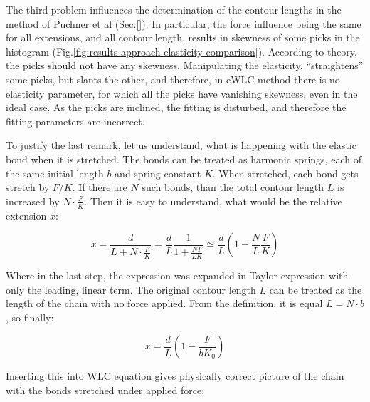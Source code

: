 The third problem influences the determination of the contour lengths in the method of Puchner et al (Sec.\ref{}).
In particular, the force influence being the same for all extensions, and all contour length, results in skewness of some picks in the histogram (Fig.\ref{fig:results-approach-elasticity-comparison}).
According to theory, the picks should not have any skewness.
Manipulating the elasticity, ``straightens'' some picks, but slants the other, and therefore, in eWLC method there is no elasticity parameter, for which all the picks have vanishing skewness, even in the ideal case.
As the picks are inclined, the fitting is disturbed, and therefore the fitting parameters are incorrect.

\setcounter{fignums}{\value{figure}}

To justify the last remark, let us understand, what is happening with the elastic bond when it is stretched.
The bonds can be treated as harmonic springs, each of the same initial length $b$ and spring constant $K$.
When stretched, each bond gets stretch by $F/K$.
If there are $N$ such bonds, than the total contour length $L$ is increased by $N\cdot\frac{F}{K}$.
Then it is easy to understand, what would be the relative extension $x$:

\begin{equation}
    x = \frac{d}{L + N\cdot\frac{F}{K}}=\frac{d}{L}\frac{1}{1+\frac{NF}{LK}}\simeq\frac{d}{L}(1-\frac{N}{L}\frac{F}{K})
    \label{eq:results-approach-elasticity-x}
\end{equation}

Where in the last step, the expression was expanded in Taylor expression with only the leading, linear term.
The original contour length $L$ can be treated as the length of the chain with no force applied.
From the definition, it is equal $L=N\cdot b$, so finally:

\begin{equation}
    x = \frac{d}{L}(1-\frac{F}{bK_0})
    \label{eq:results-approach-elasticity-x2}
\end{equation}

Inserting this into WLC equation gives physically correct picture of the chain with the bonds stretched under applied force:

